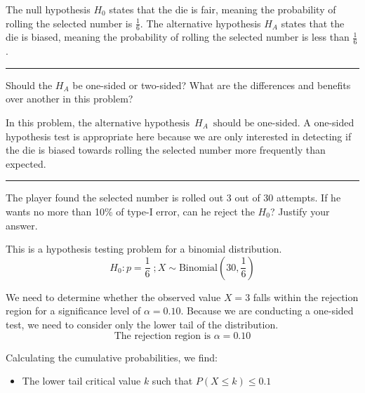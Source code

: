 \documentclass[a4paper, 10pt]{article}
\begin{document}
\begin{tosubmit}
The null hypothesis \( H_0 \) states that the die is fair, meaning the probability of rolling the selected number is \( \frac{1}{6} \).
The alternative hypothesis \( H_A \) states that the die is biased, meaning the probability of rolling the selected number is less than \( \frac{1}{6} \).

\vspace{3mm} \hrule \vspace{3mm}

\begin{subproblems}[resume]
    \item Should the \( H_A \) be one-sided or two-sided? What are the differences and benefits over another in this problem?
\end{subproblems}

\par\noindent\submitsolution
In this problem, \( \boxed{\text{the alternative hypothesis } \, H_A \, \text{ should be one-sided}} \).
A one-sided hypothesis test is appropriate here because we are only interested in detecting if the die is biased towards rolling the selected number more frequently than expected.

\vspace{3mm} \hrule \vspace{3mm}
\newpage

\begin{subproblems}[resume]
    \item The player found the selected number is rolled out 3 out of 30 attempts. If he wants no more than 10\% of type-I error, can he reject the \( H_0 \)? Justify your answer.
\end{subproblems}

\par\noindent\submitsolution
This is a hypothesis testing problem for a binomial distribution.
\[ H_0: p = \frac{1}{6} \;; X \sim \text{Binomial}(30, \frac{1}{6}) \]

We need to determine whether the observed value \( X = 3 \) falls within the rejection region for a significance level of \( \alpha = 0.10 \).
Because we are conducting a one-sided test, we need to consider only the lower tail of the distribution.
\[ \text{The rejection region is } \alpha = 0.10 \]

Calculating the cumulative probabilities, we find:
\begin{itemize}
    \item The lower tail critical value \( k \) such that \( P(X \leq k) \leq 0.1 \)
\end{itemize}


\end{tosubmit}
\end{document}
